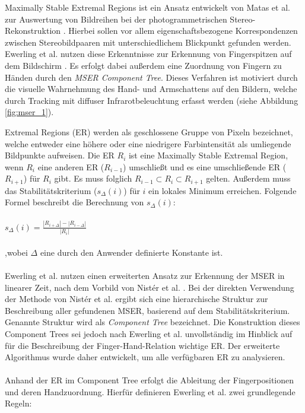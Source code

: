Maximally Stable Extremal Regions ist ein Ansatz entwickelt von Matas et al. zur Auswertung von Bildreihen bei der photogrammetrischen Stereo- \linebreak Rekonstruktion \cite{matas:2004}. Hierbei sollen vor allem eigenschaftsbezogene Korrespondenzen zwischen Stereobildpaaren mit unterschiedlichem Blickpunkt gefunden werden. Ewerling et al. nutzen diese Erkenntnisse zur Erkennung von Fingerspitzen auf dem Bildschirm \cite{ewerling:2012}. Es erfolgt dabei außerdem eine Zuordnung von Fingern zu Händen durch den \emph{MSER Component Tree}.  Dieses Verfahren ist motiviert durch die visuelle Wahrnehmung des Hand- und Armschattens auf den Bildern, welche durch Tracking mit diffuser Infrarotbeleuchtung erfasst werden (siehe Abbildung \ref{fig:mser_1}).

Extremal Regions (ER) werden als geschlossene Gruppe von Pixeln bezeichnet, welche entweder eine höhere oder eine niedrigere Farbintensität als umliegende Bildpunkte aufweisen. Die ER $R_i$ ist eine Maximally Stable Extremal Region, wenn $R_i$ eine anderen ER ($R_{i-1}$) umschließt und es eine umschließende ER ($R_{i+1}$) für $R_i$ gibt. Es muss folglich $R_{i-1} \subset R_i \subset R_{i+1}$ gelten. Außerdem muss das Stabilitätskriterium ($s_\Delta(i)$) für $i$ ein lokales Minimum erreichen. Folgende Formel beschreibt die Berechnung von $s_\Delta(i)$:
\\\\
$s_\Delta(i) = \frac{ |R_{i+\Delta}| - |R_{i-\Delta}| } { |R_i| }$
\\\\ 
,wobei $\Delta$ eine durch den Anwender definierte Konstante ist.
\\\\
Ewerling et al. nutzen einen erweiterten Ansatz zur Erkennung der MSER in linearer Zeit, nach dem Vorbild von Nistér et al. \cite{nister:2008}. Bei der direkten Verwendung der Methode von Nistér et al. ergibt sich eine hierarchische Struktur zur Beschreibung  aller gefundenen MSER, basierend auf dem Stabilitätskriterium. Genannte Struktur wird als \emph{Component Tree} bezeichnet. Die Konstruktion dieses Component Trees sei jedoch nach Ewerling et al. unvollständig im Hinblick auf für die Beschreibung der Finger-Hand-Relation wichtige ER. Der erweiterte Algorithmus wurde daher entwickelt, um alle verfügbaren ER zu analysieren.
\\\\
Anhand der ER im Component Tree erfolgt die Ableitung der Fingerpositionen und deren Handzuordnung. Hierfür definieren Ewerling et al. zwei grundlegende Regeln:

